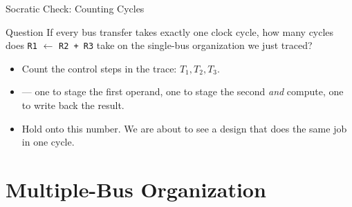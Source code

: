 \documentclass[aspectratio=169]{beamer}
\begin{document}
\begin{frame}{Socratic Check: Counting Cycles}
  \begin{alertblock}{Question}
    If every bus transfer takes exactly one clock cycle, how many cycles does
    \texttt{R1} $\gets$ \texttt{R2 + R3} take on the single-bus organization we just
    traced?
  \end{alertblock}
  \begin{itemize}
    \item Count the control steps in the trace: $T_1, T_2, T_3$.
    \item {} --- one to stage the first operand, one to stage
      the second \emph{and} compute, one to write back the result.
    \item Hold onto this number. We are about to see a design that does the same
      job in one cycle.
  \end{itemize}
\end{frame}


\section{Multiple-Bus Organization}
\end{document}
